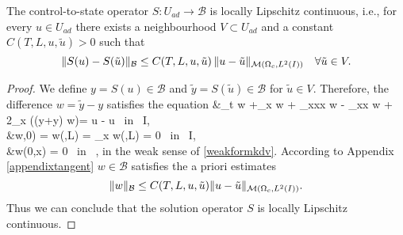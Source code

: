 \begin{lemma}
The control-to-state operator $S\colon U_{ad}\rightarrow \mathcal B$ is locally Lipschitz continuous, i.e., for every $u\in U_{ad}$ there exists a neighbourhood $V\subset U_{ad}$ and a constant
$C(T,L,u,\tilde u)>0$ such that
\[\|S(u)-S(\tilde u)\|_{\mathcal B}\leq C(T,L,u,\tilde u)\,\|u-\tilde u\|_{\mathcal{M}(\Omega_c, L^{2}(I))}\quad \forall \tilde u\in V.\]
 \label{lipschitzcontinuity}
\end{lemma}
\begin{proof}
We define $y = S(u) \in \mathcal{B}$ and $\tilde{y} = S(\tilde u) \in \mathcal{B}$ for $\tilde u\in V$. Therefore, the difference $w = \tilde{y} - y$ satisfies the equation
\bean
&\partial_t w +\partial_x w + \partial_{xxx} w - \gamma \partial_{xx} w  +  2\partial_x ((y+\tilde y) w)= \tilde u - u \mbox{ in } I\times\Omega,\\
&w\cdot,0) = w(\cdot,L) = \partial_x w(\cdot,L) = 0 \mbox{ in } I,\\
&w(0,x) = 0 \mbox{ in } \Omega,
\eean
in the weak sense of \eqref{weakformkdv}. According to Appendix \ref{appendixtangent} $w \in \mathcal{B}$ satisfies the a priori estimates
\[
\lVert w\rVert_{\mathcal{B}} \leq C(T,L,u,\tilde u)\lVert u-\tilde u\rVert_{\mathcal{M}(\Omega_c, L^{2}(I))}.
\]
Thus we can conclude that the solution operator $S$ is locally Lipschitz continuous.
\qquad\end{proof}

